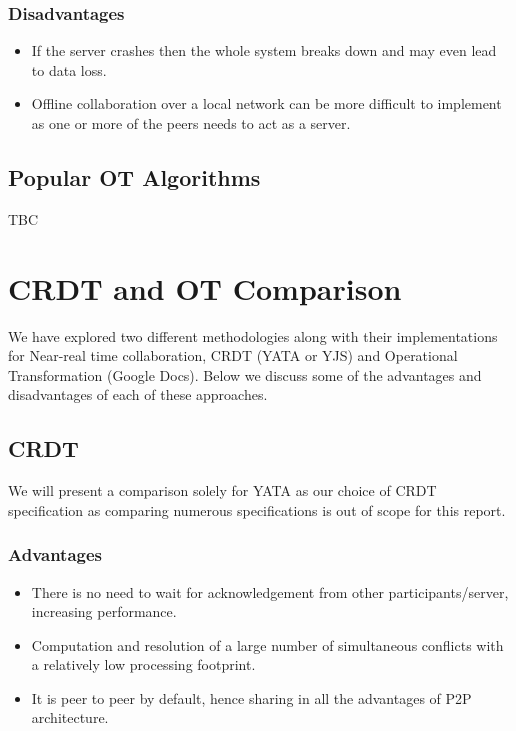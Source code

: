 \documentclass[12pt]{article}
\begin{document}
  \subsubsection*{Disadvantages}
  \begin{itemize}
    \item If the server crashes then the whole system breaks down and may even lead to data loss.
    \item Offline collaboration over a local network can be more difficult to implement as one or more of the peers needs to act as a server.
  \end{itemize}

  \subsection{Popular OT Algorithms}
  TBC

  \section{CRDT and OT Comparison}
  We have explored two different methodologies along with their implementations for Near-real time collaboration, CRDT (YATA or YJS) and
  Operational Transformation (Google Docs). Below we discuss some of the advantages and disadvantages of each of these approaches.

  \subsection{CRDT}
  We will present a comparison solely for YATA as our choice of CRDT specification as comparing numerous specifications is out of scope for this report.
  
  \subsubsection{Advantages}
  \begin{itemize}
    \item There is no need to wait for acknowledgement from other participants/server, increasing performance.
    \item Computation and resolution of a large number of simultaneous conflicts with a relatively low processing footprint.
    \item It is peer to peer by default, hence sharing in all the advantages of P2P architecture.
  \end{itemize}
\end{document}
